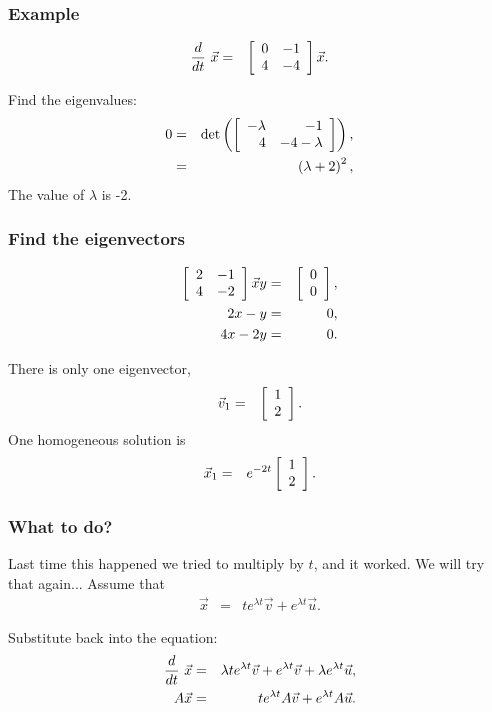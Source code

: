 \begin{frame}
  \frametitle{Example}

  \begin{eqnarray*}
    \deriv{~}{t} \vec{x} & = & \arrayTwo{0}{-1}{4}{-4} \vec{x}.
  \end{eqnarray*}

  {
    Find the eigenvalues:
    \begin{eqnarray*}
      0 & = & \det\lp\arrayTwo{-\lambda}{-1}{4}{-4-\lambda}\rp, \\
      & = & \lp \lambda + 2 \rp^2,
    \end{eqnarray*}
    The value of $\lambda$ is -2.
  }

\end{frame}


\begin{frame}
  \frametitle{Find the eigenvectors}

  \begin{eqnarray*}
    \arrayTwo{2}{-1}{4}{-2} \vec{x}{y} & = & \vecTwo{0}{0}, \\
    2x - y & = & 0, \\
    4x - 2y & = & 0.
  \end{eqnarray*}

  There is only one eigenvector,
  \begin{eqnarray*}
    \vec{v}_1 & = & \vecTwo{1}{2}.
  \end{eqnarray*}
  One homogeneous solution is 
  \begin{eqnarray*}
   \vec{x}_1 & = & e^{-2t}\vecTwo{1}{2}.
  \end{eqnarray*}

\end{frame}

\begin{frame}
  \frametitle{What to do?}

  Last time this happened we tried to multiply by $t$, and it
  worked. We will try that again...
  Assume that
  \begin{eqnarray*}
    \vec{x} & = & t e^{\lambda t} \vec{v} + e^{\lambda t} \vec{u}.
  \end{eqnarray*}

  {
    Substitute back into the equation:
    \begin{eqnarray*}
      \deriv{~}{t} \vec{x} & = & \lambda t e^{\lambda t} \vec{v} + e^{\lambda t} \vec{v} 
         + \lambda e^{\lambda t} \vec{u}, \\
      A\vec{x} & = & t e^{\lambda t} A \vec{v} + e^{\lambda t} A \vec{u}.
    \end{eqnarray*}
  }
  
\end{frame}



